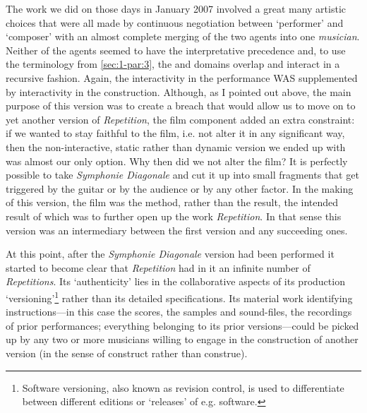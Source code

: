 \label{sec:4-par:4}
The work we did on those days in January 2007 involved a great many artistic choices that were all made by continuous negotiation between `performer' and `composer' with an almost complete merging of the two agents into one \emph{musician}. Neither of the agents seemed to have the interpretative precedence and, to use the terminology from \autoref{sec:1-par:3}, the \emph{} and \emph{} domains overlap and interact in a recursive fashion. Again, the interactivity in the performance WAS supplemented by interactivity in the construction. Although, as I pointed out above, the main purpose of this version was to create a breach that would allow us to move on to yet another version of \emph{Repetition}, the film component added an extra constraint: if we wanted to stay faithful to the film, i.e. not alter it in any significant way, then the non-interactive, static rather than dynamic version we ended up with was almost our only option. Why then did we not alter the film? It is perfectly possible to take \emph{Symphonie Diagonale} and cut it up into small fragments that get triggered by the guitar or by the audience or by any other factor. In the making of this version, the film was the method, rather than the result, the intended result of which was to further open up the work \emph{Repetition}. In that sense this version was an intermediary between the first version and any succeeding ones.

\label{sec:4-par:5}
At this point, after the \emph{Symphonie Diagonale} version had been performed it started to become clear that \emph{Repetition} had in it an infinite number of \emph{Repetitions}. Its `authenticity' lies in the collaborative aspects of its production `versioning'\footnote{Software versioning, also known as revision control, is used to differentiate between different editions or `releases' of e.g. software.} rather than its detailed specifications. Its material work identifying instructions---in this case the scores, the samples and sound-files, the recordings of prior performances; everything belonging to its prior versions---could be picked up by any two or more musicians willing to engage in the construction of another version (in the sense of construct rather than construe).

